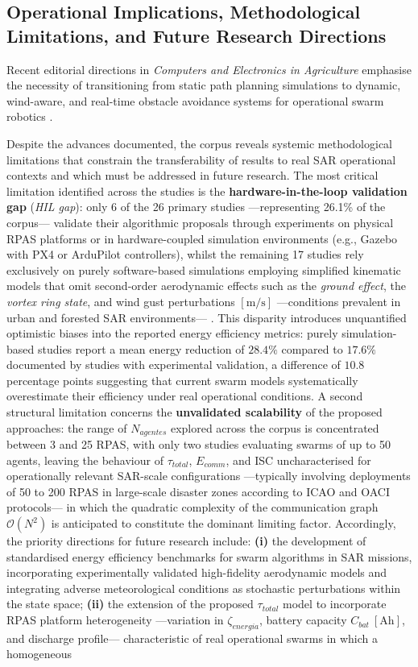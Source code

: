 \documentclass[review,3p,times]{elsarticle}
\begin{document}
\subsection{Operational Implications, Methodological Limitations, and Future Research Directions}

Recent editorial directions in \textit{Computers and Electronics in Agriculture} emphasise the necessity of transitioning from static path planning simulations to dynamic, wind-aware, and real-time obstacle avoidance systems for operational swarm robotics \cite{smith2024cea, wang2025cea}.

Despite the advances documented, the corpus reveals systemic methodological limitations that constrain the transferability of results to real SAR operational contexts and which must be addressed in future research. The most critical limitation identified across the studies is the \textbf{hardware-in-the-loop validation gap} (\textit{HIL gap}): only 6 of the 26 primary studies —representing 26.1\% of the corpus— validate their algorithmic proposals through experiments on physical RPAS platforms or in hardware-coupled simulation environments (e.g., Gazebo with PX4 or ArduPilot controllers), whilst the remaining 17 studies rely exclusively on purely software-based simulations employing simplified kinematic models that omit second-order aerodynamic effects such as the \textit{ground effect}, the \textit{vortex ring state}, and wind gust perturbations $[\text{m/s}]$ —conditions prevalent in urban and forested SAR environments— \cite{li2023, rao2024, zhang2022loc, hu2025, tang2022}. This disparity introduces unquantified optimistic biases into the reported energy efficiency metrics: purely simulation-based studies report a mean energy reduction of $28.4\%$ compared to $17.6\%$ documented by studies with experimental validation, a difference of $10.8$ percentage points suggesting that current swarm models systematically overestimate their efficiency under real operational conditions. A second structural limitation concerns the \textbf{unvalidated scalability} of the proposed approaches: the range of $N_{agentes}$ explored across the corpus is concentrated between 3 and 25 RPAS, with only two studies \cite{deng2023, wang2025} evaluating swarms of up to 50 agents, leaving the behaviour of $\tau_{total}$, $E_{comm}$, and ISC uncharacterised for operationally relevant SAR-scale configurations —typically involving deployments of 50 to 200 RPAS in large-scale disaster zones according to ICAO and OACI protocols— in which the quadratic complexity of the communication graph $\mathcal{O}(N^2)$ is anticipated to constitute the dominant limiting factor. Accordingly, the priority directions for future research include: \textbf{(i)} the development of standardised energy efficiency benchmarks for swarm algorithms in SAR missions, incorporating experimentally validated high-fidelity aerodynamic models and integrating adverse meteorological conditions as stochastic perturbations within the state space; \textbf{(ii)} the extension of the proposed $\tau_{total}$ model to incorporate RPAS platform heterogeneity —variation in $\zeta_{energia}$, battery capacity $C_{bat}\ [\text{Ah}]$, and discharge profile— characteristic of real operational swarms in which a homogeneous 
\end{document}

